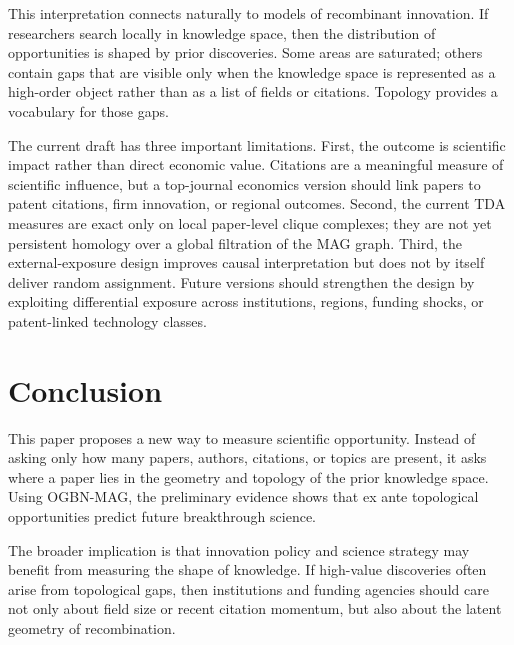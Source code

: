 \documentclass[preprint,12pt,authoryear]{elsarticle}
\begin{document}
This interpretation connects naturally to models of recombinant innovation. If researchers search locally in knowledge space, then the distribution of opportunities is shaped by prior discoveries. Some areas are saturated; others contain gaps that are visible only when the knowledge space is represented as a high-order object rather than as a list of fields or citations. Topology provides a vocabulary for those gaps.

The current draft has three important limitations. First, the outcome is scientific impact rather than direct economic value. Citations are a meaningful measure of scientific influence, but a top-journal economics version should link papers to patent citations, firm innovation, or regional outcomes. Second, the current TDA measures are exact only on local paper-level clique complexes; they are not yet persistent homology over a global filtration of the MAG graph. Third, the external-exposure design improves causal interpretation but does not by itself deliver random assignment. Future versions should strengthen the design by exploiting differential exposure across institutions, regions, funding shocks, or patent-linked technology classes.

\section{Conclusion}

This paper proposes a new way to measure scientific opportunity. Instead of asking only how many papers, authors, citations, or topics are present, it asks where a paper lies in the geometry and topology of the prior knowledge space. Using OGBN-MAG, the preliminary evidence shows that ex ante topological opportunities predict future breakthrough science.

The broader implication is that innovation policy and science strategy may benefit from measuring the shape of knowledge. If high-value discoveries often arise from topological gaps, then institutions and funding agencies should care not only about field size or recent citation momentum, but also about the latent geometry of recombination.



\end{document}

